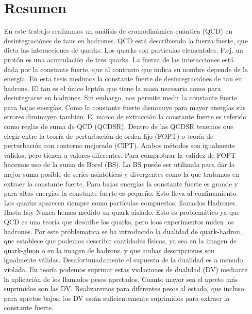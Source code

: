 \documentclass[11pt,a4paper]{article}
\begin{document}
\section*{Resumen}
En este trabajo realizamos un análisis de cromodinámica cuántica (QCD) en
desintegraciónes de taus en hadrones. QCD está describiendo la fuerza fuerte,
que dicta las interacciones de quarks. Los quarks son partículas elementales.
P.ej. un protón es una acumulación de tres quarks. La fuerza de las
interacciones está dada por la constante fuerte, que al contrario que indica su
nombre depende de la energía. En esta tesis medimos la constante fuerte de
desintegraciónes de tau en hadrons. El tau es el único leptón que tiene la masa
necesaria como para desintegrarse en hadrones. Sin embargo, nos permite medir la
constante fuerte para bajas energías. Como la constante fuerte disminuye para
mayor energías sus errores diminuyen tambien. El marco de extracción la
constante fuerte es referido como reglas de suma de QCD (QCDSR). Dentro de las
QCDSR tenemos que elegir entre la teoría de perturbación de orden fijo (FOPT) o
teoría de perturbación con contorno mejorado (CIPT). Ambos métodos son
igualmente válidos, pero tienen a valores diferentes. Para comprobrar la validez
de FOPT hacemos uso de la suma de Borel (BS). La BS puede ser utilizada para dar
la mejor suma posible de series asintóticas y divergentes como la que tratamos
en extraer la constante fuerte. Para bajas energías la constante fuerte es
grande y para altas energías la constante fuerte es pequeño. Esto lleva al
confinamiento. Los quarks aparecen siempre como partículas compuestas, llamados
Hadrones. Hasta hoy Nunca hemos medido un quark aislado. Esto es problemático ya
que QCD es una teoría que describe los quarks, pero loos experimentos miden los
hadrones. Por este problematica se ha introducido la dualidad de quark-hadron,
que establece que podemos describir cantidades físicas, ya sea en la imagen de
quark-gluon o en la imagen de hadrons, y que ambas descripciones son igualmente
válidas. Desafortunadamente el supuesto de la dualidad es a menudo violada. En
teoría podemos suprimir estas violaciones de dualidad (DV) mediante la
aplicación de los llamados pesos apretados. Cuanto mayor sea el apreto más
suprimidos son las DV. Realizaremos  para diferentes pesos al estado, que
incluso para apretos bajos, los DV están suficientemente suprimidos para
extraer la constante fuerte.
\end{document}
